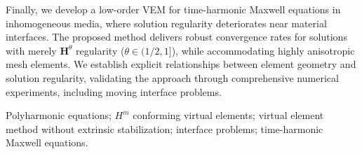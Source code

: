 \begin{enabstract}
Finally, we develop a low-order VEM for time-harmonic Maxwell equations in inhomogeneous media, where solution regularity deteriorates near material interfaces. The proposed method delivers robust convergence rates for solutions with merely \(\mathbf{H}^\theta\) regularity (\(\theta \in (1/2,1]\)), while accommodating highly anisotropic mesh elements. We establish explicit relationships between element geometry and solution regularity, validating the approach through comprehensive numerical experiments, including moving interface problems.

\end{enabstract}

\begin{enkeywords}
    Polyharmonic equations;
    $H^m$ conforming virtual elements;
    virtual element method without extrinsic stabilization;
    interface problems; time-harmonic Maxwell equations. 
\end{enkeywords} 

